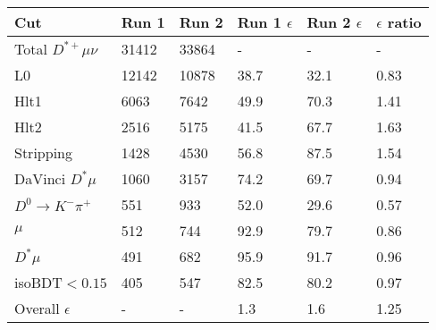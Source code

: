 \begin{tabular}{llllll}
\toprule
 Cut                       & Run 1   & Run 2   & Run 1 $\epsilon$   & Run 2 $\epsilon$   & $\epsilon$ ratio   \\
\midrule
 Total $D^{*+}\mu\nu$      & 31412   & 33864   & -                  & -                  & -                  \\
 L0                        & 12142   & 10878   & 38.7               & 32.1               & 0.83               \\
 Hlt1                      & 6063    & 7642    & 49.9               & 70.3               & 1.41               \\
 Hlt2                      & 2516    & 5175    & 41.5               & 67.7               & 1.63               \\
 Stripping                 & 1428    & 4530    & 56.8               & 87.5               & 1.54               \\
 DaVinci $D^* \mu$         & 1060    & 3157    & 74.2               & 69.7               & 0.94               \\
 $D^0\rightarrow K^-\pi^+$ & 551     & 933     & 52.0               & 29.6               & 0.57               \\
 $\mu$                     & 512     & 744     & 92.9               & 79.7               & 0.86               \\
 $D^* \mu$                 & 491     & 682     & 95.9               & 91.7               & 0.96               \\
 isoBDT$ < 0.15$           & 405     & 547     & 82.5               & 80.2               & 0.97               \\
 Overall $\epsilon$        & -       & -       & 1.3                & 1.6                & 1.25               \\
\bottomrule
\end{tabular}
